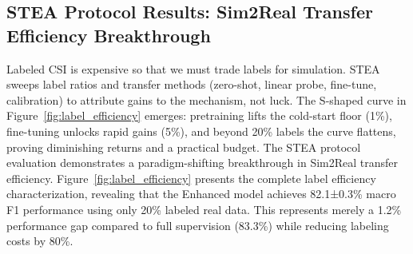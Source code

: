 \documentclass[journal]{IEEEtran}
\begin{document}
\begin{figure}[ht]
\label{fig:pca_analysis}
\end{figure}

\subsection{STEA Protocol Results: Sim2Real Transfer Efficiency Breakthrough}

Labeled CSI is expensive so that we must trade labels for simulation. 
STEA sweeps label ratios and transfer methods (zero-shot, linear probe, fine-tune, calibration) to attribute gains to the mechanism, not luck. 
The S-shaped curve in Figure~\ref{fig:label_efficiency} emerges: pretraining lifts the cold-start floor (1\%), fine-tuning unlocks rapid gains (5\%), and beyond 20\% labels the curve flattens, proving diminishing returns and a practical budget.
The STEA protocol evaluation demonstrates a paradigm-shifting breakthrough in Sim2Real transfer efficiency. Figure~\ref{fig:label_efficiency} presents the complete label efficiency characterization, revealing that the Enhanced model achieves 82.1±0.3\% macro F1 performance using only 20\% labeled real data. This represents merely a 1.2\% performance gap compared to full supervision (83.3\%) while reducing labeling costs by 80\%.
\end{document}
